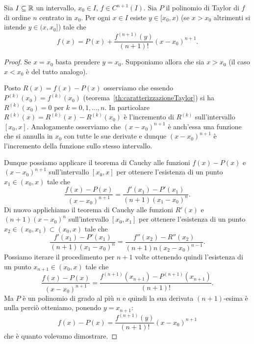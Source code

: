 \begin{theorem}
\label{th:taylor_lagrange}%
\mymark{**}%
%
%
Sia $I\subseteq \mathbb R$ un intervallo, $x_0\in I$, $f\in C^{n+1}(I)$.
Sia $P$ il polinomio di Taylor di $f$ di ordine $n$ centrato in $x_0$.
Per ogni $x\in I$ esiste $y\in [x_0,x)$
(se $x>x_0$ altrimenti si intende $y\in (x,x_0]$) tale che
\[
  f(x) = P(x) + \frac{f^{(n+1)}(y)}{(n+1)!}(x-x_0)^{n+1}.
\]
\end{theorem}
%
\begin{proof}\mymark{*}%
Se $x=x_0$ basta prendere $y=x_0$.
Supponiamo allora che sia $x>x_0$ (il caso $x<x_0$ è del tutto analogo).

Posto $R(x) = f(x)-P(x)$ osserviamo che essendo $P^{(k)}(x_0) = f^{(k)}(x_0)$
(teorema~\ref{th:caratterizzazioneTaylor})
si ha $R^{(k)}(x_0) = 0$ per $k=0,1, \dots, n$.
In particolare $R^{(k)}(x) = R^{(k)}(x)-R^{(k)}(x_0)$ è l'incremento di $R^{(k)}$
sull'intervallo $[x_0,x]$.
Analogamente osserviamo che $(x-x_0)^{n+1}$ è anch'essa
una funzione che si annulla in $x_0$ con tutte le sue derivate
e dunque $(x-x_0)^{n+1}$ è
l'incremento della funzione sullo stesso intervallo.

Dunque possiamo applicare il teorema di Cauchy alle funzioni
$f(x)-P(x)$ e $(x-x_0)^{n+1}$ sull'intervallo $[x_0,x]$ per ottenere
l'esistenza di un punto $x_1\in (x_0,x)$ tale che
\[
  \frac{f(x)-P(x)}{(x-x_0)^{n+1}}
  = \frac{f'(x_1)-P'(x_1)}{(n+1)(x_1-x_0)^n}.
\]
Di nuovo applichiamo il teorema di Cauchy alle funzioni $R'(x)$ e $(n+1)(x-x_0)^n$ sull'intervallo $[x_0,x_1]$ per ottenere
l'esistenza di un punto $x_2\in(x_0,x_1)\subset(x_0,x)$ tale che
\[
\frac{f'(x_1)-P'(x_1)}{(n+1)(x_1-x_0)^n} = \frac{f''(x_2)-R''(x_2)}{(n+1)n(x_2-x_0)^{n-1}}.
\]
Possiamo iterare il procedimento per $n+1$ volte ottenendo quindi
l'esistenza di
un punto $x_{n+1}\in(x_0,x)$ tale che
\[
  \frac{f(x)-P(x)}{(x-x_0)^{n+1}} = \frac{f^{(n+1)}(x_{n+1}) - P^{(n+1)}(x_{n+1})}{(n+1)!}.
\]
Ma $P$ è un polinomio di grado al più $n$ e quindi la sua derivata $(n+1)$-esima è nulla
perciò otteniamo, ponendo $y=x_{n+1}$:
\[
f(x) - P(x) = \frac{f^{(n+1)}(y)}{(n+1)!}(x-x_0)^{n+1}
\]
che è quanto volevamo dimostrare.
\end{proof}

